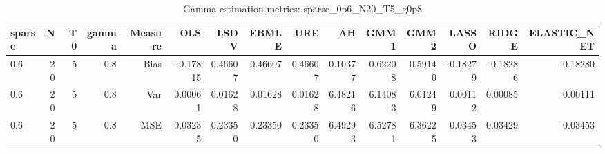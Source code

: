 \begin{table}[!htbp]\centering
\caption{Gamma estimation metrics: sparse_0p6_N20_T5_g0p8}
\label{tab:table1_sparse_0p6_N20_T5_g0p8}
\begin{tabular}{lrrrrrrrrrrrrrr}
\hline
sparse & N & T0 & gamma & Measure & OLS & LSDV & EBMLE & URE & AH & GMM1 & GMM2 & LASSO & RIDGE & ELASTIC_NET \\
\hline
0.6 & 20 & 5 & 0.8 & Bias & -0.17815 & 0.46607 & 0.46607 & 0.46607 & 0.10377 & 0.62208 & 0.59140 & -0.18279 & -0.18286 & -0.18280 \\
0.6 & 20 & 5 & 0.8 & Var & 0.00061 & 0.01628 & 0.01628 & 0.01628 & 6.48216 & 6.14083 & 6.01249 & 0.00112 & 0.00085 & 0.00111 \\
0.6 & 20 & 5 & 0.8 & MSE & 0.03235 & 0.23350 & 0.23350 & 0.23350 & 6.49293 & 6.52781 & 6.36225 & 0.03453 & 0.03429 & 0.03453 \\
\hline
\end{tabular}
\end{table}


